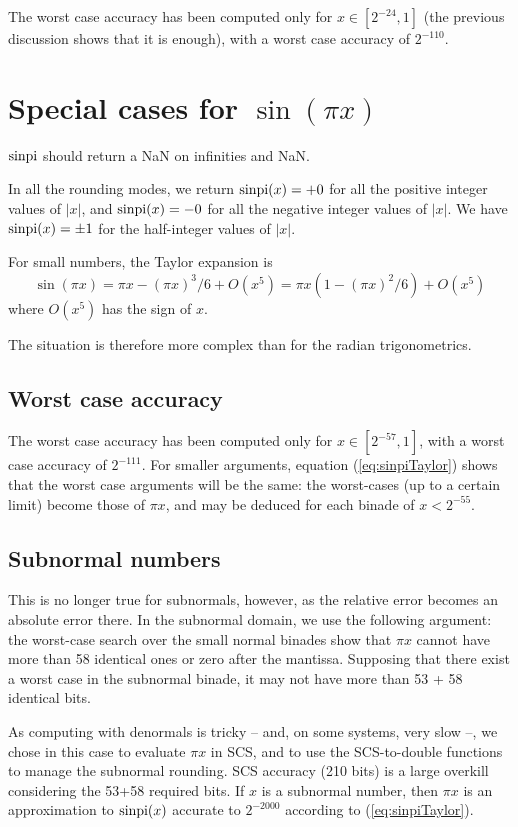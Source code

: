 The worst case accuracy has been computed only for $x \in [2^{-24},
1]$ (the previous discussion shows that it is enough), with a worst
case accuracy of $2^{-110}$.



\section{Special cases for $\sin(\pi x)$}
$\operatorname{sinpi}$ should return a NaN on infinities and NaN.

In all the rounding modes, we return $\operatorname{sinpi}(x)=+0$ for all the positive
integer values of $|x|$, and $\operatorname{sinpi}(x)=-0$ for all the negative integer
values of $|x|$. We have $\operatorname{sinpi}(x)=\pm 1$ for  the half-integer
values of $|x|$.

For small numbers, the Taylor expansion is
\begin{equation}
  \sin(\pi x) = \pi x - (\pi x)^3/6 + O(x^5) = \pi x(1-(\pi
  x)^2/6) + O(x^5)\label{eq:sinpiTaylor}
\end{equation}
  where $O(x^5)$ has the sign of $x$.

The situation is therefore more complex than for the radian
trigonometrics.

\subsection{Worst case accuracy}

The worst case accuracy has been computed only for $x \in [2^{-57},
1]$, with a worst case accuracy of $2^{-111}$. For smaller arguments,
equation (\ref{eq:sinpiTaylor}) shows that the worst case arguments
will be the same: the worst-cases (up to a certain limit) become those
of $\pi x$, and may be deduced for each binade of $x<2^{-55}$.

\subsection{Subnormal numbers}
This is no longer true for subnormals, however, as the relative error
becomes an absolute error there. In the subnormal domain, we use the
following argument: the worst-case search over the small normal
binades show that $\pi x$ cannot have more than 58 identical ones or
zero after the mantissa.  Supposing that there exist a worst case in
the subnormal binade, it may not have more than 53 + 58 identical
bits.

As computing with denormals is tricky -- and, on some systems, very
slow --, we chose in this case to evaluate $\pi x$ in SCS, and to use
the SCS-to-double functions to manage the subnormal rounding. SCS
accuracy (210 bits) is a large overkill considering the 53+58 required
bits. If $x$ is a subnormal number, then $\pi x$ is an approximation to
$\operatorname{sinpi}(x)$ accurate to $2^{-2000}$ according to
(\ref{eq:sinpiTaylor}).



